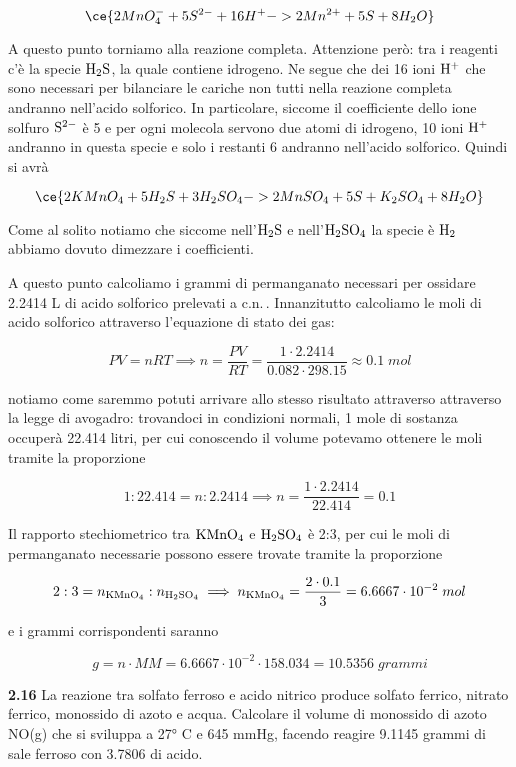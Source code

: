 $$\ce{2MnO_4^- + 5S^{2-} + 16H^+ -> 2Mn^{2+} + 5S + 8H_2O}$$

A questo punto torniamo alla reazione completa. Attenzione però: tra i reagenti c'è la specie $\rm H_2S$, la quale contiene idrogeno. Ne segue che dei 16 ioni $\rm H^+$ che sono necessari per bilanciare le cariche non tutti nella reazione completa andranno nell'acido solforico. In particolare, siccome il coefficiente dello ione solfuro $\rm S^{2-}$ è 5 e per ogni molecola servono due atomi di idrogeno, 10 ioni $\rm H^+$ andranno in questa specie e solo i restanti 6 andranno nell'acido solforico. Quindi si avrà

$$\ce{2KMnO_4 + 5H_2S + 3H_2SO_4 -> 2MnSO_4 + 5S + K_2SO_4 + 8H_2O}$$

Come al solito notiamo che siccome nell'$\rm H_2S$ e nell'$\rm H_2SO_4$ la specie è $\rm H_2$ abbiamo dovuto dimezzare i coefficienti.

A questo punto calcoliamo i grammi di permanganato necessari per ossidare 2.2414 L di acido solforico prelevati a c.n.\,. Innanzitutto calcoliamo le moli di acido solforico attraverso l'equazione di stato dei gas:

$$PV=nRT
\implies
n=\frac{PV}{RT}
=\frac{1 \cdot 2.2414}{0.082 \cdot 298.15}
\approx 0.1\;mol$$

notiamo come saremmo potuti arrivare allo stesso risultato attraverso attraverso la legge di avogadro: trovandoci in condizioni normali, 1 mole di sostanza occuperà 22.414 litri, per cui conoscendo il volume potevamo ottenere le moli tramite la proporzione

$$1:22.414=n:2.2414
\implies
n=\frac{1 \cdot 2.2414}{22.414}=0.1$$

Il rapporto stechiometrico tra $\rm KMnO_4$ e $\rm H_2SO_4$ è 2:3, per cui le moli di permanganato necessarie possono essere trovate tramite la proporzione

$$2:3=n_{\rm KMnO_4}:n_{\rm H_2SO_4}
\implies
n_{\rm KMnO_4}=\frac{2 \cdot 0.1}{3}=6.6667 \cdot 10^{-2}\;mol$$

e i grammi corrispondenti saranno

$$g=n \cdot MM=6.6667 \cdot 10^{-2} \cdot 158.034
=10.5356\;grammi$$

\vspace{0.2cm}\textbf{2.16} La reazione tra solfato ferroso e acido nitrico produce solfato ferrico, nitrato ferrico, monossido di azoto e acqua. Calcolare il volume di monossido di azoto NO(g) che si sviluppa a 27° C e 645 mmHg, facendo reagire 9.1145 grammi di sale ferroso con 3.7806 di acido.

